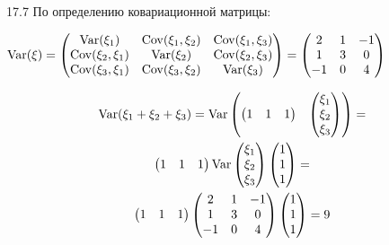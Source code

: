 \begin{solution}{{17.7}}
По определению ковариационной матрицы:

$\operatorname{Var} (\xi) =  \begin{pmatrix}
\operatorname{Var} (\xi_1) & \operatorname{Cov} (\xi_1, \xi_2) & \operatorname{Cov} (\xi_1, \xi_3) \\
\operatorname{Cov} (\xi_2, \xi_1) & \operatorname{Var} (\xi_2) & \operatorname{Cov} (\xi_2, \xi_3) \\
\operatorname{Cov} (\xi_3, \xi_1) & \operatorname{Cov} (\xi_3, \xi_2) & \operatorname{Var} (\xi_3) \\
\end{pmatrix}  =  \begin{pmatrix}
2 & 1 & -1 \\
1 & 3 & 0 \\
-1 & 0 & 4 \\
\end{pmatrix} $

\begin{multline*}
\operatorname{Var} (\xi_1 + \xi_2 + \xi_3)  = \operatorname{Var}   \begin{pmatrix}
 \begin{pmatrix}
1 & 1 & 1 \\
\end{pmatrix}  &  \begin{pmatrix}
\xi_1 \\
\xi_2 \\
\xi_3 \\
\end{pmatrix}
\end{pmatrix}  = \\
\begin{pmatrix}
1 & 1 & 1 \\
\end{pmatrix}  \operatorname{Var}   \begin{pmatrix}
\xi_1 \\
\xi_2 \\
\xi_3 \\
\end{pmatrix}   \begin{pmatrix}
1 \\
1 \\
1 \\
\end{pmatrix}  = \\
 \begin{pmatrix}
1 & 1 & 1 \\
\end{pmatrix}   \begin{pmatrix}
2 & 1 & -1 \\
1 & 3 & 0 \\
-1 & 0 & 4 \\
\end{pmatrix}   \begin{pmatrix}
1 \\
1 \\
1 \\
\end{pmatrix}  = 9
\end{multline*}
\end{solution}
